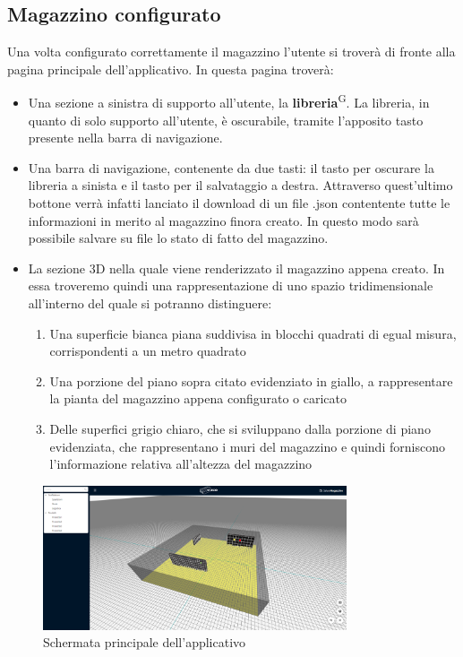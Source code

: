    \subsection{Magazzino configurato}\label{sec:principale}
        Una volta configurato correttamente il magazzino l'utente si troverà di fronte alla pagina principale dell'applicativo. 
        In questa pagina troverà: 
        \begin{itemize}
            \item Una sezione a sinistra di supporto all'utente, la \textbf{libreria}\textsuperscript{G}. La libreria, in quanto di solo supporto all'utente, è 
                  oscurabile, tramite l'apposito tasto presente nella barra di navigazione. 
            \item Una barra di navigazione, contenente da due tasti: il tasto per oscurare la libreria a sinista e il tasto per il salvataggio a destra. 
                  Attraverso quest'ultimo bottone verrà infatti lanciato il download di un file .json contentente tutte le informazioni in merito 
                  al magazzino finora creato. In questo modo sarà possibile salvare su file lo stato di fatto del magazzino. 
            \item La sezione 3D nella quale viene renderizzato il magazzino appena creato. In essa troveremo quindi una rappresentazione di uno spazio tridimensionale 
                  all'interno del quale si potranno distinguere: 
            \begin{enumerate}
                \item Una superficie bianca piana suddivisa in blocchi quadrati di egual misura, corrispondenti a un metro quadrato
                \item Una porzione del piano sopra citato evidenziato in giallo, a rappresentare la pianta del magazzino appena configurato o caricato
                \item Delle superfici grigio chiaro, che si sviluppano dalla porzione di piano evidenziata, che rappresentano i muri del magazzino e quindi forniscono 
                l'informazione relativa all'altezza del magazzino
            \end{enumerate}
        \end{itemize}
        \begin{figure}[h!]
            \centering
            \includegraphics[width=0.8\textwidth]{images/schermata_principale.png}
            \caption{Schermata principale dell'applicativo}
        \end{figure}

